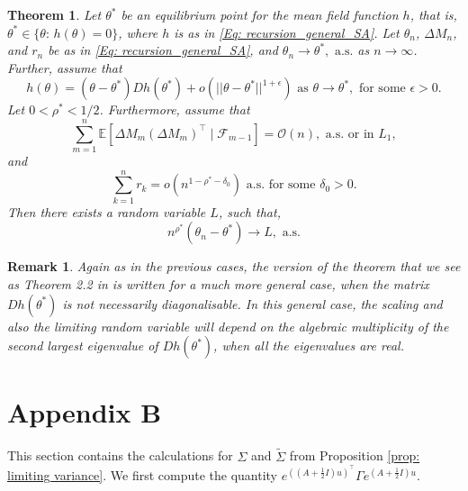 \documentclass{article}
\numberwithin{equation}{section}
\newtheorem{theorem}{Theorem}[section]
\newtheorem{remark}{Remark}
\newcommand{\FF}{\mbox{${\mathcal F}$}}
\newcommand{\OO}{\mbox{${\mathcal O}$}}
\newcommand{\1}{\mathbf{1}}
\newcommand{\0}{\mathbf{0}}
\newcommand{\E}{\mbox{${\mathbb E}$}}
\begin{document}
\begin{theorem}
\label{Thm: CLT_SA_for_rho_leq_1/2} Let $\theta^*$ be an equilibrium point for the mean field function $h$, that is, $\theta^* \in \{\theta: \, h(\theta)=0\}$, where $h$ is as in \eqref{Eq: recursion_general_SA}. Let $\theta_n$, $\Delta M_n$, and $r_n$ be as in \eqref{Eq: recursion_general_SA}, and $\theta_n \longrightarrow \theta^*, \text{ a.s.}$ as $n \to \infty$. 
Further, assume that 
\begin{equation}
\label{Eq: Taylor_expnasion_for_theta_1}
{h(\theta)= \left(\theta -\theta^*\right) Dh(\theta^*)+ o(\lvert \lvert \theta -\theta^*\rvert \rvert^{1+\epsilon}) \text{ as } \theta \rightarrow \theta^*, \text{ for some } \epsilon>0.}
\end{equation}
Let $0< \rho^* < 1/2$. Furthermore, assume that 
\begin{equation}
\label{Eq:_second_moment_martingale_difference_rho_leq_half}
\sum_{m=1}^n \E \left[\Delta M_m \left(\Delta M_m\right)^\top \mid \FF_{m-1}\right]= \OO(n), \text{ a.s. or in } L_1,
\end{equation}
and 
\begin{equation}
\label{Eq: error_rate_rho_leq_half}
\sum_{k=1}^n r_k= o\left(n^{1-\rho^*-\delta_0}\right)
\text{ a.s. for some } \delta_0>0.
\end{equation}
Then there exists a random variable $L$, such that, 
\begin{equation}
\label{Eq: CLT_rho_leq_half}
n^{\rho^*}\left(\theta_n-\theta^*\right)\rightarrow L, \text{ a.s.}
\end{equation}
\end{theorem}
\begin{remark} 
\label{Rem: discussion_rho*_leq_half}
Again as in the previous cases, the version of the theorem that we see as Theorem 2.2 in \cite{Zh_2016} is written for a much more general case, when the matrix $Dh(\theta^*)$ is not necessarily diagonalisable. In this general case, the scaling and also the limiting random variable will depend on the algebraic multiplicity of the second largest eigenvalue of $Dh(\theta^*)$, when all the eigenvalues are real. 
\end{remark}


\section*{Appendix B}\label{Appendix B}

This section contains the calculations for $\Sigma$ and $\widetilde{\Sigma}$ from Proposition \ref{prop: limiting variance}.
We first compute the quantity $e^{\left((A+\frac{1}{2} I)u\right)^\top} \Gamma e^{(A+\frac{1}{2} I )u}$.
\ 
\end{document}
